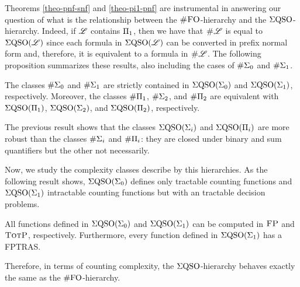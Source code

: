Theorems \ref{theo-pnf-snf} and \ref{theo-pi1-pnf} are instrumental in answering our question of what is the relationship between the $\text{\sc \#FO}$-hierarchy and the $\Sigma{\rm QSO}$-hierarchy. 
Indeed, if $\mathscr{L}$ contains $\Pi_{1}$, then we have that $\text{\sc \#} \mathscr{L}$ is equal to $\Sigma{\rm QSO}(\mathscr{L})$ since each formula in $\Sigma{\rm QSO}(\mathscr{L})$ can be converted in prefix normal form and, therefore, it is equivalent to a formula in $\text{\sc \#} \mathscr{L}$. 
The following proposition summarizes these results, also including the cases of $\#\Sigma_{0}$ and $\#\Sigma_{1}$.
\begin{proposition}
	The classes $\#\Sigma_{0}$ and $\#\Sigma_{1}$ are strictly contained in $\Sigma{\rm QSO}(\Sigma_{0})$ and $\Sigma{\rm QSO}(\Sigma_{1})$, respectively. Moreover, the classes $\#\Pi_{1}$, $\#\Sigma_{2}$, and $\#\Pi_{2}$ are equivalent with $\Sigma{\rm QSO}(\Pi_{1})$, $\Sigma{\rm QSO}(\Sigma_{2})$, and $\Sigma{\rm QSO}(\Pi_{2})$, respectively.
\end{proposition}
The previous result shows that the classes $\Sigma{\rm QSO}(\Sigma_{i})$ and $\Sigma{\rm QSO}(\Pi_{i})$ are more robust than the classes $\#\Sigma_{i}$ and $\#\Pi_{i}$: they are closed under binary and sum quantifiers but the other not necessarily. 

Now, we study the complexity classes describe by this hierarchies. As the following result shows, $\Sigma{\rm QSO}(\Sigma_{0})$ defines only tractable counting functions and $\Sigma{\rm QSO}(\Sigma_{1})$ intractable counting functions but with an tractable decision problems. 
\begin{proposition} \label{prop:qe0-fp-qe1-totp-fptras}
All functions defined in $\Sigma{\rm QSO}(\Sigma_{0})$ and $\Sigma{\rm QSO}(\Sigma_{1})$ can be computed in $\text{\sc FP}$ and $\text{\sc TotP}$, respectively. Furthermore, every function defined in $\Sigma{\rm QSO}(\Sigma_{1})$ has a FPTRAS.
\end{proposition}
Therefore, in terms of counting complexity, the $\Sigma{\rm QSO}$-hierarchy behaves exactly the same as the $\#{\rm FO}$-hierarchy.

